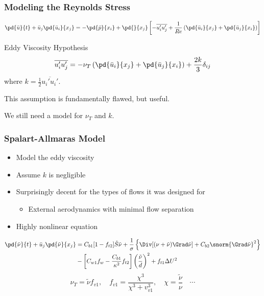 \documentclass{beamer}
\def\nut{\tilde\nu}
\begin{document}
\begin{frame}\frametitle{Modeling the Reynolds Stress}
\begin{equation*}
\pd{\bar u}{t}+\bar u_j\pd{\bar u_i}{x_j}=-\pd{\bar p}{x_i}
+\pd{}{x_j}\left[-\overline{u_i'u_j'}
+\frac{1}{Re}\left(\pd{\bar u_i}{x_j}+\pd{\bar u_j}{x_i}\right)\right]
\end{equation*}
\begin{block}{Eddy Viscosity Hypothesis}
\begin{equation*}
\overline{u_i'u_j'}=-\nu_T\left(\pd{\bar u_i}{x_j}+\pd{\bar u_j}{x_i}\right)
+\frac{2k}{3}\delta_{ij}
\end{equation*}
where $k=\frac{1}{2}\overline{u_i'u_i'}$.
\end{block}
This assumption is fundamentally flawed, but useful.

\vspace{2ex}
We still need a model for $\nu_T$ and $k$.
\end{frame}

\begin{frame}\frametitle{Spalart-Allmaras Model}
\begin{itemize}
	\item Model the eddy viscosity
	\item Assume $k$ is negligible
	\item Surprisingly decent for the types of flows it was designed for 
  \begin{itemize}
  \item External aerodynamics with minimal flow separation
  \end{itemize}
  \item Highly nonlinear equation
\end{itemize}
\begin{align*}
\pd{\nut}{t}+\bar u_j\pd{\nut}{x_j}&=C_{b1}[1-f_{t2}]\tilde S\nut+\frac{1}{\sigma}
\left\{\Div[(\nu+\nut)\Grad\nut]+C_{b2}\snorm{\Grad\nut}^2\right\}\\
&-\left[C_{w1}f_{w}-\frac{C_{b1}}{\kappa^2}f_{t2}\right]\left(\frac{\nut}{d}\right)^2+f_{t1}\Delta U^2
\end{align*}
\begin{equation*}
\nu_T=\nut f_{v1},\quad f_{v1}=\frac{\chi^3}{\chi^3+v_{v1}^3},
\quad \chi=\frac{\nut}{\nu}\quad\cdots
\end{equation*}
\end{frame}
\end{document}
